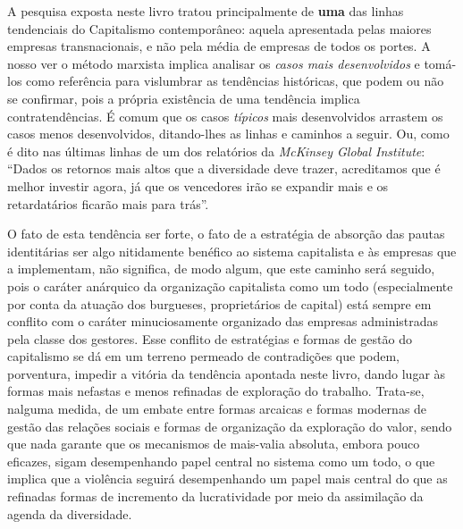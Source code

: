 A pesquisa exposta neste livro tratou principalmente de \textbf{uma} das
linhas tendenciais do Capitalismo contemporâneo: aquela apresentada
pelas maiores empresas transnacionais, e não pela média de empresas de
todos os portes. A nosso ver o método marxista implica analisar os
\emph{casos mais desenvolvidos} e tomá-los como referência para
vislumbrar as tendências históricas, que podem ou não se confirmar, pois
a própria existência de uma tendência implica contratendências. É comum
que os casos \emph{típicos} mais desenvolvidos arrastem os casos menos
desenvolvidos, ditando-lhes as linhas e caminhos a seguir. Ou, como é
dito nas últimas linhas de um dos relatórios da \emph{McKinsey Global
Institute}: ``Dados os retornos mais altos que a diversidade deve
trazer, acreditamos que é melhor investir agora, já que os vencedores
irão se expandir mais e os retardatários ficarão mais para trás''.

O fato de esta tendência ser forte, o fato de a estratégia de absorção
das pautas identitárias ser algo nitidamente benéfico ao sistema
capitalista e às empresas que a implementam, não significa, de modo
algum, que este caminho será seguido, pois o caráter anárquico da
organização capitalista como um todo (especialmente por conta da atuação
dos burgueses, proprietários de capital) está sempre em conflito com o
caráter minuciosamente organizado das empresas administradas pela classe
dos gestores. Esse conflito de estratégias e formas de gestão do
capitalismo se dá em um terreno permeado de contradições que podem,
porventura, impedir a vitória da tendência apontada neste livro, dando
lugar às formas mais nefastas e menos refinadas de exploração do
trabalho. Trata-se, nalguma medida, de um embate entre formas arcaicas e
formas modernas de gestão das relações sociais e formas de organização
da exploração do valor, sendo que nada garante que os mecanismos de
mais-valia absoluta, embora pouco eficazes, sigam desempenhando papel
central no sistema como um todo, o que implica que a violência seguirá
desempenhando um papel mais central do que as refinadas formas de
incremento da lucratividade por meio da assimilação da agenda da
diversidade.

